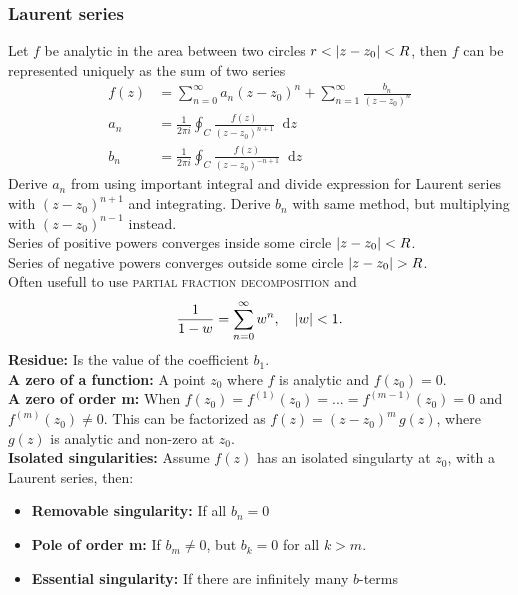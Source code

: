\documentclass[a4paper, 10pt]{article}
\newcommand*\diff{\mathop{}\!\mathrm{d}}
\begin{document}
\begin{multicols*}{3}
\subsubsection*{Laurent series}
Let $f$ be analytic in the area between two circles $r < \abs{z-z_0} < R$, then $f$ can be represented uniquely as the sum of two series
\begin{align*}
  f(z) &= \sum_{n=0}^{\infty} a_n(z-z_0)^n + \sum_{n=1}^{\infty} \frac{b_n}{(z-z_0)^n} \\
  a_n &= \frac{1}{2\pi i} \oint_C \frac{f(z)}{(z-z_0)^{n+1}} \diff z \\
  b_n &= \frac{1}{2\pi i} \oint_C \frac{f(z)}{(z-z_0)^{-n+1}} \diff z
\end{align*}
Derive $a_n$ from using important integral and divide expression for Laurent series with $(z-z_0)^{n+1}$ and integrating. Derive $b_n$ with same method, but multiplying with $(z-z_0)^{n-1}$ instead.\\
Series of positive powers converges inside  some circle $\abs{z-z_0} < R$. \\
Series of negative powers converges outside some circle $\abs{z-z_0} > R$. \\
Often usefull to use \textsc{partial fraction decomposition} and
\begin{equation*}
  \frac{1}{1-w} = \sum_{n=0}^{\infty} w^n, \quad \abs{w}<1.
\end{equation*}
\textbf{Residue:} Is the value of the coefficient $b_1$.\\
\textbf{A zero of a function:} A point $z_0$ where $f$ is analytic and $f(z_0)=0$.\\
\textbf{A zero of order m:} When $f(z_0) = f^{(1)}(z_0) = ... = f^{(m-1)}(z_0)=0$ and $f^(m)(z_0)\neq 0$. This can be factorized as $f(z) = (z-z_0)^m\,g(z)$, where $g(z)$ is analytic and non-zero at $z_0$.\\
\textbf{Isolated singularities:} Assume $f(z)$ has an isolated singularty at $z_0$, with a Laurent series, then:
\begin{itemize}
  \item \textbf{Removable singularity:} If all $b_n=0$
  \item \textbf{Pole of order m:} If $b_m\neq 0$, but $b_k=0$ for all $k>m$.
  \item \textbf{Essential singularity:} If there are infinitely many $b$-terms
\end{itemize}


\end{multicols*}
\end{document}
